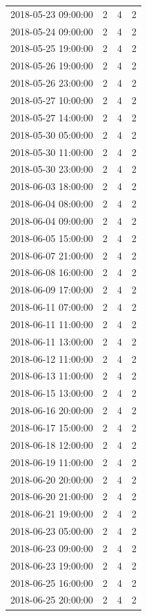\begin{tabular}{lrrr}
2018-05-23 09:00:00 & 2 & 4 & 2 \\
2018-05-24 09:00:00 & 2 & 4 & 2 \\
2018-05-25 19:00:00 & 2 & 4 & 2 \\
2018-05-26 19:00:00 & 2 & 4 & 2 \\
2018-05-26 23:00:00 & 2 & 4 & 2 \\
2018-05-27 10:00:00 & 2 & 4 & 2 \\
2018-05-27 14:00:00 & 2 & 4 & 2 \\
2018-05-30 05:00:00 & 2 & 4 & 2 \\
2018-05-30 11:00:00 & 2 & 4 & 2 \\
2018-05-30 23:00:00 & 2 & 4 & 2 \\
2018-06-03 18:00:00 & 2 & 4 & 2 \\
2018-06-04 08:00:00 & 2 & 4 & 2 \\
2018-06-04 09:00:00 & 2 & 4 & 2 \\
2018-06-05 15:00:00 & 2 & 4 & 2 \\
2018-06-07 21:00:00 & 2 & 4 & 2 \\
2018-06-08 16:00:00 & 2 & 4 & 2 \\
2018-06-09 17:00:00 & 2 & 4 & 2 \\
2018-06-11 07:00:00 & 2 & 4 & 2 \\
2018-06-11 11:00:00 & 2 & 4 & 2 \\
2018-06-11 13:00:00 & 2 & 4 & 2 \\
2018-06-12 11:00:00 & 2 & 4 & 2 \\
2018-06-13 11:00:00 & 2 & 4 & 2 \\
2018-06-15 13:00:00 & 2 & 4 & 2 \\
2018-06-16 20:00:00 & 2 & 4 & 2 \\
2018-06-17 15:00:00 & 2 & 4 & 2 \\
2018-06-18 12:00:00 & 2 & 4 & 2 \\
2018-06-19 11:00:00 & 2 & 4 & 2 \\
2018-06-20 20:00:00 & 2 & 4 & 2 \\
2018-06-20 21:00:00 & 2 & 4 & 2 \\
2018-06-21 19:00:00 & 2 & 4 & 2 \\
2018-06-23 05:00:00 & 2 & 4 & 2 \\
2018-06-23 09:00:00 & 2 & 4 & 2 \\
2018-06-23 19:00:00 & 2 & 4 & 2 \\
2018-06-25 16:00:00 & 2 & 4 & 2 \\
2018-06-25 20:00:00 & 2 & 4 & 2 \\

\end{tabular}
